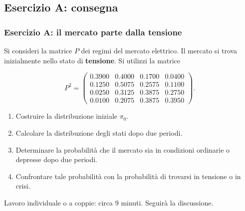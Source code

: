 \documentclass[handout]{beamer}%
\providecommand{\QTR}[2]{\csname #1\endcsname{#2}}
\begin{document}
\subsection{Esercizio A: consegna}%

\begin{frame}%
%

\frametitle{Esercizio A: il mercato parte dalla tensione}%


Si consideri la matrice $P$ dei regimi del mercato elettrico. Il mercato si
trova inizialmente nello stato di \textbf{tensione}. Si utilizzi la matrice%

\[
P^{2} =
\begin{pmatrix}
0.3900 & 0.4000 & 0.1700 & 0.0400\\
0.1250 & 0.5075 & 0.2575 & 0.1100\\
0.0250 & 0.3125 & 0.3875 & 0.2750\\
0.0100 & 0.2075 & 0.3875 & 0.3950
\end{pmatrix}
.
\]


\medskip

\begin{enumerate}
\item[1.] Costruire la distribuzione iniziale $\pi_{0}$.

\item[2.] Calcolare la distribuzione degli stati dopo due periodi.

\item[3.] Determinare la probabilit\`{a} che il mercato sia in condizioni
ordinarie o depresse dopo due periodi.

\item[4.] Confrontare tale probabilit\`{a} con la probabilit\`{a} di trovarsi
in tensione o in crisi.
\end{enumerate}

\medskip

\begin{center}
{\small Lavoro individuale o a coppie: circa 9 minuti. Seguir\`{a} la
discussione.}
\end{center}%

\transboxout
\end{frame}%
\end{document}
